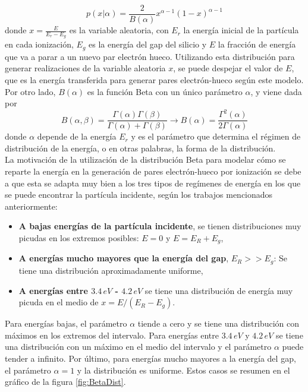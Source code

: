 \begin{equation*}
    p(x|\alpha) = \frac{2}{B(\alpha)} x^{\alpha - 1}(1-x)^{\alpha - 1}
\end{equation*}
donde $x = \frac{E}{E_{r} - E_{g}}$ es la variable aleatoria, con $E_{r}$ la energía inicial de la partícula en cada ionización, $E_{g}$ es la energía del gap del silicio y $E$ la fracción de energía que va a parar a un nuevo par electrón hueco. Utilizando esta distribución para generar realizaciones de la variable aleatoria $x$, se puede despejar el valor de $E$, que es la energía transferida para generar pares electrón-hueco según este modelo. Por otro lado, $B(\alpha)$ es la función Beta con un único parámetro $\alpha$, y viene dada por
\begin{equation*}
    B(\alpha, \beta) 
    = \frac{\Gamma(\alpha)\Gamma(\beta)}{\Gamma(\alpha) + \Gamma(\beta)}
    \longrightarrow
    B(\alpha)
    = \frac{\Gamma^{2}(\alpha)}{2\Gamma(\alpha)}
\end{equation*}
donde $\alpha$ depende de la energía $E_{r}$ y es el parámetro que determina el régimen de distribución de la energía, o en otras palabras, la forma de la distribución.\\
\indent La motivación de la utilización de la distribución Beta para modelar cómo se reparte la energía en la generación de pares electrón-hueco por ionización se debe a que esta se adapta muy bien a los tres tipos de regímenes de energía en los que se puede encontrar la partícula incidente, según los trabajos mencionados anteriormente:
\begin{itemize}
    \item \textbf{A bajas energías de la partícula incidente}, se tienen distribuciones muy picudas en los extremos posibles: $E = 0$ y $E = E_{R}+E_{g}$,
    \item \textbf{A energías mucho mayores que la energía del gap}, $E_{R} >> E_{g}$: Se tiene una distribución aproximadamente uniforme,
    \item \textbf{A energías entre $3.4\,\si{eV}$ - $4.2\,\si{eV}$} se tiene una distribución de energía muy picuda en el medio de $x = E/(E_{R} - E_{g})$.
\end{itemize}
Para energías bajas, el parámetro $\alpha$ tiende a cero y se tiene una distribución con máximos en los extremos del intervalo. Para energías entre $3.4\,\si{eV}$ y $4.2\,\si{eV}$ se tiene una distribución con un máximo en el medio del intervalo y el parámetro $\alpha$ puede tender a infinito. Por último, para energías mucho mayores a la energía del gap, el parámetro $\alpha = 1$ y la distribución es uniforme. Estos casos se resumen en el gráfico de la figura \ref{fig:BetaDist}.\\

